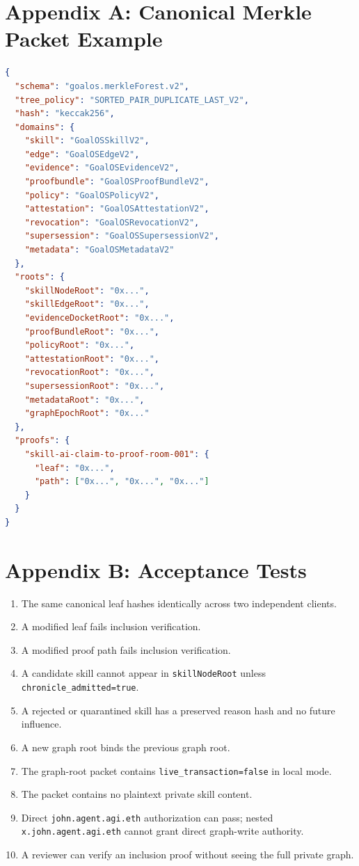 \documentclass[11pt,letterpaper]{article}
\begin{document}
\section*{Appendix A: Canonical Merkle Packet Example}
\begin{lstlisting}[language=json]
{
  "schema": "goalos.merkleForest.v2",
  "tree_policy": "SORTED_PAIR_DUPLICATE_LAST_V2",
  "hash": "keccak256",
  "domains": {
    "skill": "GoalOSSkillV2",
    "edge": "GoalOSEdgeV2",
    "evidence": "GoalOSEvidenceV2",
    "proofbundle": "GoalOSProofBundleV2",
    "policy": "GoalOSPolicyV2",
    "attestation": "GoalOSAttestationV2",
    "revocation": "GoalOSRevocationV2",
    "supersession": "GoalOSSupersessionV2",
    "metadata": "GoalOSMetadataV2"
  },
  "roots": {
    "skillNodeRoot": "0x...",
    "skillEdgeRoot": "0x...",
    "evidenceDocketRoot": "0x...",
    "proofBundleRoot": "0x...",
    "policyRoot": "0x...",
    "attestationRoot": "0x...",
    "revocationRoot": "0x...",
    "supersessionRoot": "0x...",
    "metadataRoot": "0x...",
    "graphEpochRoot": "0x..."
  },
  "proofs": {
    "skill-ai-claim-to-proof-room-001": {
      "leaf": "0x...",
      "path": ["0x...", "0x...", "0x..."]
    }
  }
}
\end{lstlisting}

\section*{Appendix B: Acceptance Tests}
\begin{enumerate}
\item The same canonical leaf hashes identically across two independent clients.
\item A modified leaf fails inclusion verification.
\item A modified proof path fails inclusion verification.
\item A candidate skill cannot appear in \texttt{skillNodeRoot} unless \texttt{chronicle\_admitted=true}.
\item A rejected or quarantined skill has a preserved reason hash and no future influence.
\item A new graph root binds the previous graph root.
\item The graph-root packet contains \texttt{live\_transaction=false} in local mode.
\item The packet contains no plaintext private skill content.
\item Direct \texttt{john.agent.agi.eth} authorization can pass; nested \texttt{x.john.agent.agi.eth} cannot grant direct graph-write authority.
\item A reviewer can verify an inclusion proof without seeing the full private graph.
\end{enumerate}
\end{document}
